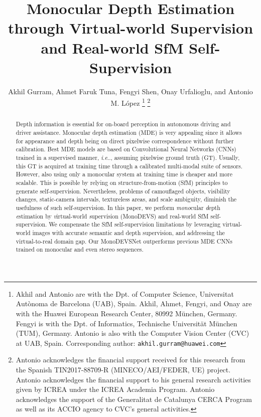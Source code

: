 \documentclass[journal]{IEEEtran}
\makeatletter
\DeclareRobustCommand\onedot{\futurelet\@let@token\@onedot}
\def\@onedot{\ifx\@let@token.\else.\null\fi\xspace}
\def\ie{\emph{i.e}\onedot} \def\Ie{\emph{I.e}\onedot}
\makeatother
\begin{document}
\title{Monocular Depth Estimation through Virtual-world Supervision and Real-world SfM Self-Supervision}


\author{Akhil Gurram,
        Ahmet Faruk Tuna,
        Fengyi Shen,
        Onay Urfalioglu,
        and Antonio M. L\'opez
\thanks{Akhil and Antonio are with the Dpt. of Computer Science, Universitat Aut\`onoma de Barcelona (UAB), Spain. Akhil, Ahmet, Fengyi, and Onay are with the Huawei European Research Center, 80992 M{\"u}nchen, Germany. Fengyi is with the Dpt. of Informatics, Technische Universit\"at München (TUM), Germany. Antonio is also with the Computer Vision Center (CVC) at UAB, Spain. Corresponding author: {\tt\small akhil.gurram@huawei.com} }      
\thanks{Antonio acknowledges the financial support received for this research from the Spanish TIN2017-88709-R (MINECO/AEI/FEDER, UE) project. Antonio acknowledges the financial support to his general research activities given by ICREA under the ICREA Academia Program. Antonio acknowledges the support of the Generalitat de Catalunya CERCA Program as well as its ACCIO agency to CVC's general activities.}}










\maketitle

\begin{abstract}
Depth information is essential for on-board perception in autonomous driving and driver assistance. Monocular depth estimation (MDE) is very appealing since it allows for appearance and depth being on direct pixelwise correspondence without further calibration. Best MDE models are based on Convolutional Neural Networks (CNNs) trained in a supervised manner, {\ie}, assuming pixelwise ground truth (GT). Usually, this GT is acquired at training time through a calibrated multi-modal suite of sensors. However, also using only a monocular system at training time is cheaper and more scalable. This is possible by relying on structure-from-motion (SfM) principles to generate self-supervision. Nevertheless, problems of camouflaged objects, visibility changes, static-camera intervals, textureless areas, and scale ambiguity, diminish the usefulness of such self-supervision. In this paper, we perform \emph{mono}cular \emph{d}epth \emph{e}stimation by \emph{v}irtual-world \emph{s}upervision (MonoDEVS) and real-world SfM self-supervision. We compensate the SfM self-supervision limitations by leveraging virtual-world images with accurate semantic and depth supervision, and addressing the virtual-to-real domain gap. Our MonoDEVSNet outperforms previous MDE CNNs trained on monocular and even stereo sequences.
\end{abstract}
\end{document}
